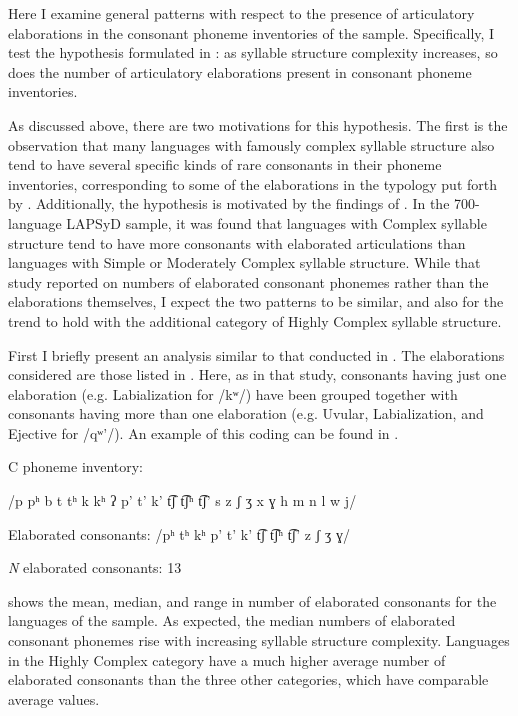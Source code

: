   Here I examine general patterns with respect to the presence of articulatory elaborations in the consonant phoneme inventories of the sample. Specifically, I test the hypothesis formulated in : as syllable structure complexity increases, so does the number of articulatory elaborations present in consonant phoneme inventories.

  As discussed above, there are two motivations for this hypothesis. The first is the observation that many languages with famously complex syllable structure also tend to have several specific kinds of rare consonants in their phoneme inventories, corresponding to some of the elaborations in the typology put forth by \citet{LindblomMaddieson1988}. Additionally, the hypothesis is motivated by the findings of \citet{MaddiesonEtAl2013}. In the 700-language LAPSyD sample, it was found that languages with Complex syllable structure tend to have more consonants with elaborated articulations than languages with Simple or Moderately Complex syllable structure. While that study reported on numbers of elaborated consonant phonemes rather than the elaborations themselves, I expect the two patterns to be similar, and also for the trend to hold with the additional category of Highly Complex syllable structure.

  First I briefly present an analysis similar to that conducted in \citet{MaddiesonEtAl2013}. The elaborations considered are those listed in . Here, as in that study, consonants having just one elaboration (e.g. Labialization for /kʷ/) have been grouped together with consonants having more than one elaboration (e.g. Uvular, Labialization, and Ejective for /qʷ’/). An example of this coding can be found in .

\ea\label{ex:4.26}
\begin{Coding}
\item[C phoneme inventory:] \item[] /p pʰ b t tʰ k kʰ ʔ p’ t’ k’ t͡ʃ t͡ʃʰ t͡ʃ’ s z ʃ ʒ x ɣ h m n l w j/

\item[Elaborated consonants:] /pʰ tʰ kʰ p’ t’ k’ t͡ʃ t͡ʃʰ t͡ʃ’ z ʃ ʒ ɣ/

\item[\textit{N} elaborated consonants:] 13
\end{Coding}
\z

   shows the mean, median, and range in number of elaborated consonants for the languages of the sample. As expected, the median numbers of elaborated consonant phonemes rise with increasing syllable structure complexity. Languages in the Highly Complex category have a much higher average number of elaborated consonants than the three other categories, which have comparable average values.


